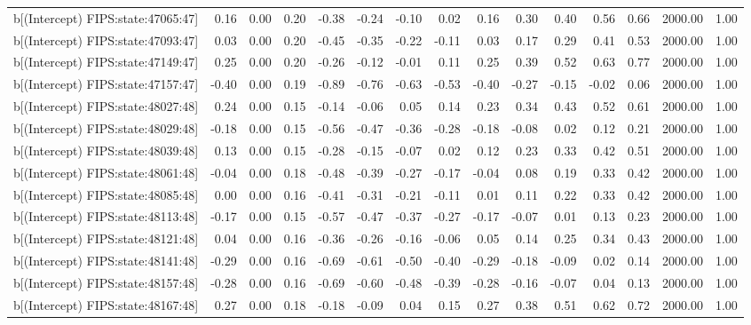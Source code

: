 \begin{table}[ht]
\begin{tabular}{rrrrrrrrrrrrrrr}
  b[(Intercept) FIPS:state:47065:47] & 0.16 & 0.00 & 0.20 & -0.38 & -0.24 & -0.10 & 0.02 & 0.16 & 0.30 & 0.40 & 0.56 & 0.66 & 2000.00 & 1.00 \\ 
  b[(Intercept) FIPS:state:47093:47] & 0.03 & 0.00 & 0.20 & -0.45 & -0.35 & -0.22 & -0.11 & 0.03 & 0.17 & 0.29 & 0.41 & 0.53 & 2000.00 & 1.00 \\ 
  b[(Intercept) FIPS:state:47149:47] & 0.25 & 0.00 & 0.20 & -0.26 & -0.12 & -0.01 & 0.11 & 0.25 & 0.39 & 0.52 & 0.63 & 0.77 & 2000.00 & 1.00 \\ 
  b[(Intercept) FIPS:state:47157:47] & -0.40 & 0.00 & 0.19 & -0.89 & -0.76 & -0.63 & -0.53 & -0.40 & -0.27 & -0.15 & -0.02 & 0.06 & 2000.00 & 1.00 \\ 
  b[(Intercept) FIPS:state:48027:48] & 0.24 & 0.00 & 0.15 & -0.14 & -0.06 & 0.05 & 0.14 & 0.23 & 0.34 & 0.43 & 0.52 & 0.61 & 2000.00 & 1.00 \\ 
  b[(Intercept) FIPS:state:48029:48] & -0.18 & 0.00 & 0.15 & -0.56 & -0.47 & -0.36 & -0.28 & -0.18 & -0.08 & 0.02 & 0.12 & 0.21 & 2000.00 & 1.00 \\ 
  b[(Intercept) FIPS:state:48039:48] & 0.13 & 0.00 & 0.15 & -0.28 & -0.15 & -0.07 & 0.02 & 0.12 & 0.23 & 0.33 & 0.42 & 0.51 & 2000.00 & 1.00 \\ 
  b[(Intercept) FIPS:state:48061:48] & -0.04 & 0.00 & 0.18 & -0.48 & -0.39 & -0.27 & -0.17 & -0.04 & 0.08 & 0.19 & 0.33 & 0.42 & 2000.00 & 1.00 \\ 
  b[(Intercept) FIPS:state:48085:48] & 0.00 & 0.00 & 0.16 & -0.41 & -0.31 & -0.21 & -0.11 & 0.01 & 0.11 & 0.22 & 0.33 & 0.42 & 2000.00 & 1.00 \\ 
  b[(Intercept) FIPS:state:48113:48] & -0.17 & 0.00 & 0.15 & -0.57 & -0.47 & -0.37 & -0.27 & -0.17 & -0.07 & 0.01 & 0.13 & 0.23 & 2000.00 & 1.00 \\ 
  b[(Intercept) FIPS:state:48121:48] & 0.04 & 0.00 & 0.16 & -0.36 & -0.26 & -0.16 & -0.06 & 0.05 & 0.14 & 0.25 & 0.34 & 0.43 & 2000.00 & 1.00 \\ 
  b[(Intercept) FIPS:state:48141:48] & -0.29 & 0.00 & 0.16 & -0.69 & -0.61 & -0.50 & -0.40 & -0.29 & -0.18 & -0.09 & 0.02 & 0.14 & 2000.00 & 1.00 \\ 
  b[(Intercept) FIPS:state:48157:48] & -0.28 & 0.00 & 0.16 & -0.69 & -0.60 & -0.48 & -0.39 & -0.28 & -0.16 & -0.07 & 0.04 & 0.13 & 2000.00 & 1.00 \\ 
  b[(Intercept) FIPS:state:48167:48] & 0.27 & 0.00 & 0.18 & -0.18 & -0.09 & 0.04 & 0.15 & 0.27 & 0.38 & 0.51 & 0.62 & 0.72 & 2000.00 & 1.00 \\ 

\end{tabular}
\end{table}

